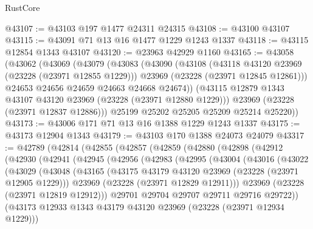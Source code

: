 \begin{lexlean}{RustCore}
\begin{coremodule}
@43107 := @43103 @197 @1477 @24311 @24315
@43108 := @43100 @43107
@43115 := @43091 @71 @13 @16 @1477 @1229 @1243 @1337
@43118 := @43115 @12854 @1343 @43107
@43120 := @23963 @42929 @1160
@43165 := @43058
    (@43062
      (@43069
        (@43079
          (@43083
            (@43090
              (@43108
                (@43118 @43120 @23969 (@23228 (@23971 @12855 @1229)))
                @23969
                (@23228 (@23971 @12845 @12861)))
              @24653
              @24656
              @24659
              @24663
              @24668
              @24674))
          (@43115 @12879 @1343 @43107 @43120 @23969 (@23228 (@23971 @12880 @1229)))
          @23969
          (@23228 (@23971 @12837 @12886)))
        @25199
        @25202
        @25205
        @25209
        @25214
        @25220))
@43173 := @43006 @171 @71 @13 @16 @1388 @1229 @1243 @1337
@43175 := @43173 @12904 @1343
@43179 := @43103 @170 @1388 @24073 @24079
@43317 := @42789
    (@42814
      (@42855
        (@42857
          (@42859
            (@42880
              (@42898
                (@42912
                  (@42930
                    (@42941
                      (@42945
                        (@42956
                          (@42983
                            (@42995
                              (@43004
                                (@43016
                                  (@43022
                                    (@43029
                                      (@43048
                                        (@43165
                                          (@43175
                                            @43179
                                            @43120
                                            @23969
                                            (@23228 (@23971 @12905 @1229)))
                                          @23969
                                          (@23228 (@23971 @12829 @12911)))
                                        @23969
                                        (@23228 (@23971 @12819 @12912)))
                                      @29701
                                      @29704
                                      @29707
                                      @29711
                                      @29716
                                      @29722))
                                  (@43173
                                    @12933
                                    @1343
                                    @43179
                                    @43120
                                    @23969
                                    (@23228 (@23971 @12934 @1229)))

\end{coremodule}
\end{lexlean}
